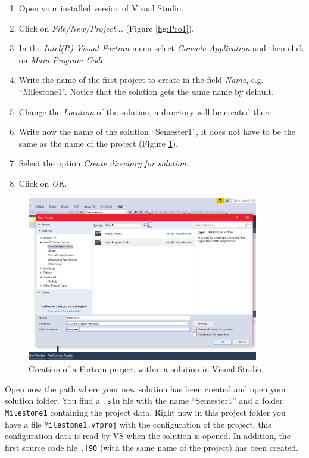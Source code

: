 \begin{enumerate}[nosep]
    \item Open your installed version of Visual Studio.
    \item Click on \textit{File/New/Project...} (Figure \ref{fig:Pro1}).
    \item In the \textit{Intel(R) Visual Fortran} menu select \textit{Console Application} and then click on \textit{Main Program Code}.
    \item Write the name of the first project to create in the field \textit{Name}, e.g. ``Milestone1''. Notice that the solution gets the same name by default. 
    \item Change the \textit{Location} of the solution, a directory will be created there.
    \item Write now the name of the solution ``Semester1'', it does not have to be the same as the name of the project (Figure \ref{fig:Intro1}).  
    \item Select the option \textit{Create directory for solution}.
    \item Click on \textit{OK}.
\end{enumerate}

\begin{figure}
    \centering
    \includegraphics[width= 0.9\textwidth]{Figures/Intro1}
    \caption{Creation of a Fortran project within a solution in Visual Studio.}
    \label{fig:Intro1}
\end{figure}

Open now the path where your new solution has been created and open your solution folder. You find a \texttt{.sln} file with the name ``Semester1'' and a folder \texttt{Milestone1} containing the project data. Right now in this project folder you have a file \texttt{Milestone1.vfproj} with the configuration of the project, this configuration data is read by VS when the solution is opened. In addition, the first source code file \texttt{.f90} (with the same name of the project) has been created.

